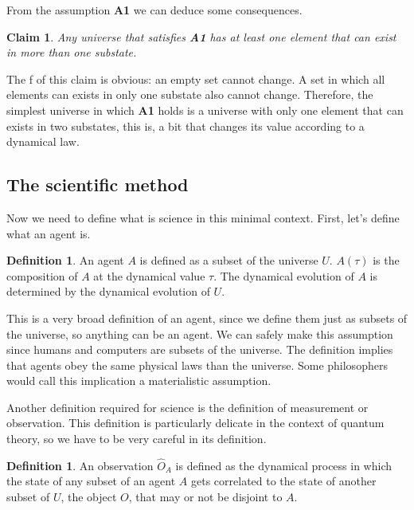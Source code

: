 \documentclass[11pt,a4paper,twoside]{report}
\newcommand{\+}{\textnormal{+} }
\newtheorem{myclaim}[mythm]{Claim}
\theoremstyle{definition}
\newtheorem{mydef}[mythm]{Definition}
\numberwithin{equation}{chapter}
\begin{document}
From the assumption \textbf{A1} we can deduce some consequences.
\begin{myclaim}
Any universe that satisfies \textbf{A1} has at least one element that can exist
in more than one substate.
\end{myclaim}

The f of this claim is obvious: an empty set cannot change. A set in which
all elements can exists in only one substate also cannot change. Therefore, the
simplest universe in which \textbf{A1} holds is a universe with only one element
that can exists in two substates, this is, a bit that changes its value
according to a dynamical law.

\subsection{The scientific method}

Now we need to define what is science in this minimal context. First, let's
define what an agent is.

\begin{mydef}
  An agent $A$ is defined as a subset of the universe $U$. $A(\tau)$ is the
  composition of $A$ at the dynamical value $\tau$. The dynamical evolution of
  $A$ is determined by the dynamical evolution of $U$.
\end{mydef}

This is a very broad definition of an agent, since we define them just as
subsets of the universe, so anything can be an agent. We can safely make this
assumption since humans and computers are subsets of the universe. The
definition implies that agents obey the same physical laws than the universe.
Some philosophers would call this implication a materialistic assumption.

\par

Another definition required for science is the definition of measurement or
observation. This definition is particularly delicate in the context of quantum
theory, so we have to be very careful in its definition. 

\begin{mydef}
  An observation $\hat{O}_A$ is defined as the dynamical process in which the
  state of any subset of an agent $A$ gets correlated to the state of another
  subset of $U$, the object $O$, that may or not be disjoint to $A$.  
\end{mydef}
\end{document}
